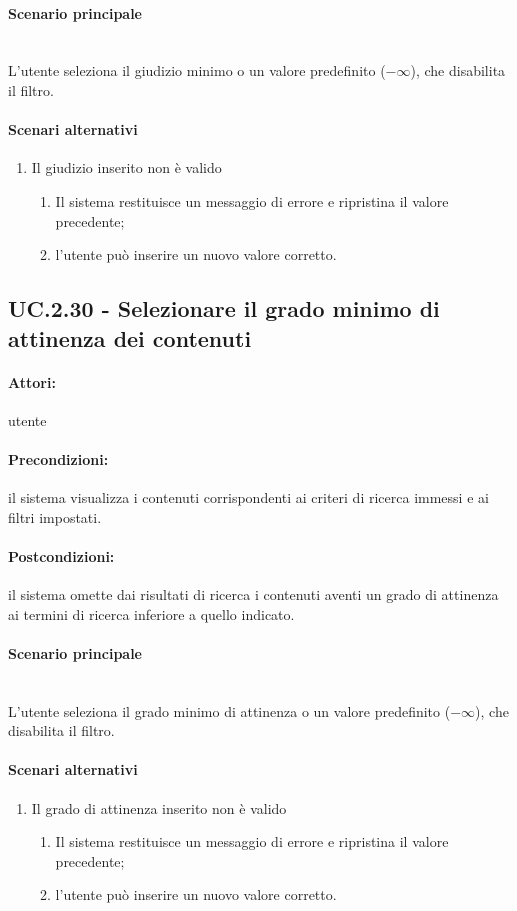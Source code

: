 \documentclass[10pt,a4paper,headinclude,footinclude,hidelinks]{scrreprt} %
\begin{document}
	\paragraph{Scenario principale} \hfill \\
	L'utente seleziona il giudizio minimo o un valore predefinito ($-\infty$), che disabilita il filtro.
	\paragraph{Scenari alternativi}
	\begin{enumerate}
	\item Il giudizio inserito non è valido
		\begin{enumerate}
		\item Il sistema restituisce un messaggio di errore e ripristina il valore precedente;
		\item l'utente può inserire un nuovo valore corretto.
		\end{enumerate}
	\end{enumerate}

	\subsection[UC.2.30]{UC.2.30 - Selezionare il grado minimo di attinenza dei contenuti}
	\label{sec:stage:ar:uc:2_30}
	\paragraph{Attori:} utente
	\paragraph{Precondizioni:} il sistema visualizza i contenuti corrispondenti ai criteri di ricerca immessi e ai filtri impostati.
	\paragraph{Postcondizioni:} il sistema omette dai risultati di ricerca i contenuti aventi un grado di attinenza ai termini di ricerca inferiore a quello indicato.
	\paragraph{Scenario principale} \hfill \\
	L'utente seleziona il grado minimo di attinenza o un valore predefinito ($-\infty$), che disabilita il filtro.
	\paragraph{Scenari alternativi}
	\begin{enumerate}
	\item Il grado di attinenza inserito non è valido
		\begin{enumerate}
		\item Il sistema restituisce un messaggio di errore e ripristina il valore precedente;
		\item l'utente può inserire un nuovo valore corretto.
		\end{enumerate}
	\end{enumerate}
\end{document}
